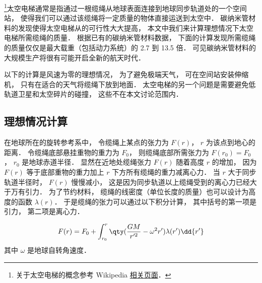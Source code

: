 

\footnote{关于太空电梯的概念参考 Wikipedia \href{https://en.wikipedia.org/wiki/Space_elevator}{相关页面}．}太空电梯通常是指通过一根缆绳从地球表面连接到地球同步轨道处的一个空间站， 使得我们可以通过该缆绳将一定质量的物体直接运送到太空中． 碳纳米管材料的发现使得太空电梯从的可行性大大提高， 本文中我们来计算理想情况下太空电梯所需缆绳的质量． 根据已有的碳纳米管材料数据， 下面的计算发现所需缆绳的质量仅仅是最大载重（包括动力系统）的 2.7 到 13.5 倍． 可见碳纳米管材料的大规模生产将很有可能开启全新的航天时代．

以下的计算是风速为零的理想情况， 为了避免极端天气， 可在空间站安装伸缩机， 只有在适合的天气将缆绳下放到地面． 太空电梯的另一个问题是需要避免低轨道卫星和太空碎片的碰撞， 这些不在本文讨论范围内．

\subsection{理想情况计算}
在地球所在的旋转参考系中， 令缆绳上某点的张力为 $F(r)$， $r$ 为该点到地心的距离． 令缆绳底部悬挂重物的重力为 $F_0$， 则缆绳底部所需张力为 $F(r_0) = F_0$， $r_0$ 是地球赤道半径． 显然在近地处缆绳张力 $F(r)$ 随着高度 $r$ 的增加， 因为 $F(r)$ 等于底部重物的重力加上 $r$ 下方所有缆绳的重力减离心力． 当 $r$ 大于同步轨道半径时， $F(r)$ 慢慢减小， 这是因为同步轨道以上缆绳受到的离心力已经大于万有引力． 为了节约材料， 缆绳的线密度（单位长度的质量）也可以设计为高度的函数 $\lambda(r)$． 于是缆绳的张力可以通过以下积分计算， 其中括号的第一项是引力， 第二项是离心力．

\begin{equation}\label{SpcLad_eq1}
F(r) = F_0 + \int_{r_0}^{r} \qty(\frac{GM}{r'^2} - \omega^2 r') \lambda(r') \dd{r'}
\end{equation}
其中 $\omega$ 是地球自转角速度．

